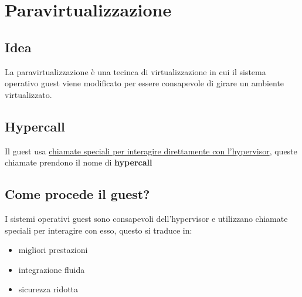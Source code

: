 \section{Paravirtualizzazione}
\subsection{Idea}
La paravirtualizzazione è una tecinca di virtualizzazione in cui il sistema operativo guest viene modificato per essere consapevole di girare un ambiente virtualizzato.

\subsection{Hypercall}
Il guest usa \uline{chiamate speciali per interagire direttamente con l'hypervisor}, queste chiamate prendono il nome di \textbf{hypercall}

\subsection{Come procede il guest?}
I sistemi operativi guest sono consapevoli dell'hypervisor e utilizzano chiamate speciali per interagire con esso, questo si traduce in:
\begin{itemize}
    \item migliori prestazioni
    \item integrazione fluida
    \item sicurezza ridotta
\end{itemize}

